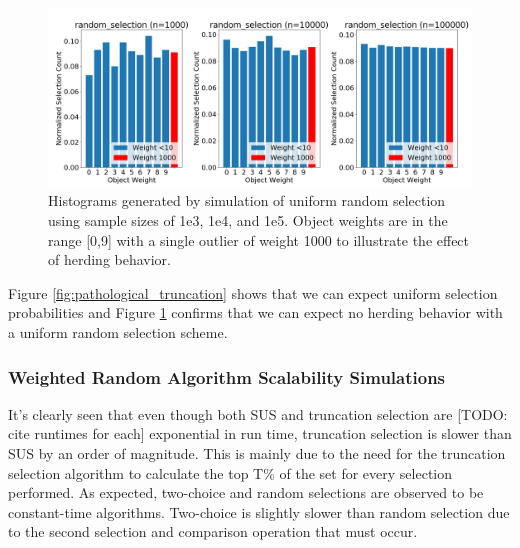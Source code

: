\documentclass[12pt]{article}
\begin{document}
    \begin{figure}[h]
      \centering
      \includegraphics[scale=0.30]{images/pathological_random.png} 
      \caption{Histograms generated by simulation of uniform random selection
               using sample sizes of 1e3, 1e4, and 1e5. Object weights are in
               the range [0,9] with a single outlier of weight 1000 to
               illustrate the effect of herding behavior.}
      \label{fig:pathological_random}
    \end{figure}

    Figure \ref{fig:pathological_truncation} shows that we can expect uniform
    selection probabilities and Figure \ref{fig:pathological_random} confirms
    that we can expect no herding behavior with a uniform random selection
    scheme.

    \subsubsection{Weighted Random Algorithm Scalability Simulations}
    It's clearly seen that even though both SUS and truncation selection are
    [TODO: cite runtimes for each]
    exponential in run time, truncation selection is slower than SUS by an
    order of magnitude. This is mainly due to the need for the truncation
    selection algorithm to calculate the top T\% of the set for every selection
    performed. As expected, two-choice and random selections are
    observed to be constant-time algorithms. Two-choice is slightly slower than
    random selection due to the second selection and comparison operation that
    must occur.
\end{document}
